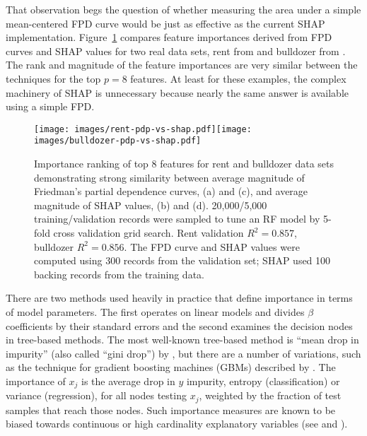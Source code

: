 \documentclass[smallextended]{svjour3}       %
\newcommand{\figref}[1]{Figure~\ref{#1}}
\begin{document}
That observation begs the question of whether measuring the area under a simple mean-centered FPD curve would be just as effective as the current SHAP implementation.  \figref{fig:fpd_imp} compares feature importances derived from FPD curves and SHAP values for two real data sets, rent from \cite{rent} and bulldozer from \cite{bulldozer}. The rank and magnitude of the feature importances are very similar between the techniques for the top  $p=8$ features. At least for these examples, the complex machinery of SHAP is unnecessary because nearly the same answer is available using a simple FPD. 

\begin{figure}[htbp]
\begin{center}
\texttt{[image: images/rent-pdp-vs-shap.pdf]}\texttt{[image: images/bulldozer-pdp-vs-shap.pdf]}\\
\vspace{-3mm}
\caption[short]{\small  Importance ranking of top 8 features for rent and bulldozer data sets demonstrating strong similarity between average magnitude of Friedman's partial dependence curves, (a) and (c), and average magnitude of SHAP values, (b) and (d). 20,000/5,000 training/validation records were sampled to tune an RF model by 5-fold cross validation grid search. Rent validation $R^2 = 0.857$, bulldozer $R^2 = 0.856$. The FPD curve and SHAP values were computed using 300 records from the validation set; SHAP used 100 backing records from the training data.}
\label{fig:fpd_imp}
\end{center}
\end{figure}

There are two methods used heavily in practice that define importance in terms of model parameters. The first operates on linear models and divides $\beta$ coefficients by their standard errors and the second examines the decision nodes in tree-based methods. The most well-known tree-based method is ``mean drop in impurity'' (also called ``gini drop'') by \cite{CART}, but there are a number of variations, such as the technique for gradient boosting machines (GBMs) described by \cite{PDP}.  The importance of $x_j$ is the average drop in $y$ impurity, entropy (classification) or variance (regression), for all nodes testing $x_j$, weighted by the fraction of test samples that reach those nodes. Such importance measures are known to be biased towards continuous or high cardinality explanatory variables (see \citealt{permbias} and \citealt{RFunbiased}).
\end{document}
